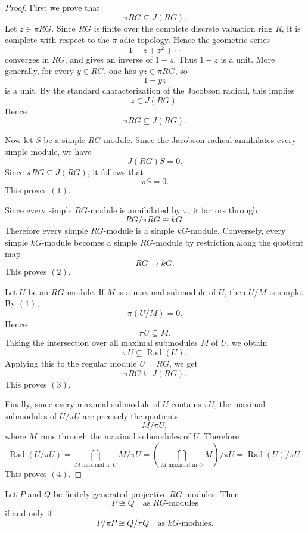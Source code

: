 \begin{proof}
    First we prove that
    \[
        \pi RG\subseteq J(RG).
    \]
    Let \(z\in \pi RG\). Since \(RG\) is finite over the complete discrete valuation
    ring \(R\), it is complete with respect to the \(\pi\)-adic topology. Hence the
    geometric series
    \[
        1+z+z^2+\cdots
    \]
    converges in \(RG\), and gives an inverse of \(1-z\). Thus \(1-z\) is a unit.
    More generally, for every \(y\in RG\), one has \(yz\in \pi RG\), so
    \[
        1-yz
    \]
    is a unit. By the standard characterization of the Jacobson radical, this implies
    \[
        z\in J(RG).
    \]
    Hence
    \[
        \pi RG\subseteq J(RG).
    \]

    Now let \(S\) be a simple \(RG\)-module. Since the Jacobson radical annihilates
    every simple module, we have
    \[
        J(RG)S=0.
    \]
    Since \(\pi RG\subseteq J(RG)\), it follows that
    \[
        \pi S=0.
    \]
    This proves \((1)\).

    Since every simple \(RG\)-module is annihilated by \(\pi\), it factors through
    \[
        RG/\pi RG\cong kG.
    \]
    Therefore every simple \(RG\)-module is a simple \(kG\)-module. Conversely, every
    simple \(kG\)-module becomes a simple \(RG\)-module by restriction along the
    quotient map
    \[
        RG\longrightarrow kG.
    \]
    This proves \((2)\).

    Let \(U\) be an \(RG\)-module. If \(M\) is a maximal submodule of \(U\), then
    \(U/M\) is simple. By \((1)\),
    \[
        \pi(U/M)=0.
    \]
    Hence
    \[
        \pi U\subseteq M.
    \]
    Taking the intersection over all maximal submodules \(M\) of \(U\), we obtain
    \[
        \pi U\subseteq \operatorname{Rad}(U).
    \]
    Applying this to the regular module \(U=RG\), we get
    \[
        \pi RG\subseteq J(RG).
    \]
    This proves \((3)\).

    Finally, since every maximal submodule of \(U\) contains \(\pi U\), the maximal
    submodules of \(U/\pi U\) are precisely the quotients
    \[
        M/\pi U,
    \]
    where \(M\) runs through the maximal submodules of \(U\). Therefore
    \[
        \operatorname{Rad}(U/\pi U)
        =
        \bigcap_{M\text{ maximal in }U} M/\pi U
        =
        \left(\bigcap_{M\text{ maximal in }U}M\right)/\pi U
        =
        \operatorname{Rad}(U)/\pi U.
    \]
    This proves \((4)\).
\end{proof}

\begin{corollary}
    Let \(P\) and \(Q\) be finitely generated projective \(RG\)-modules. Then
    \[
        P\cong Q
        \quad\text{as }RG\text{-modules}
    \]
    if and only if
    \[
        P/\pi P\cong Q/\pi Q
        \quad\text{as }kG\text{-modules}.
    \]
\end{corollary}

